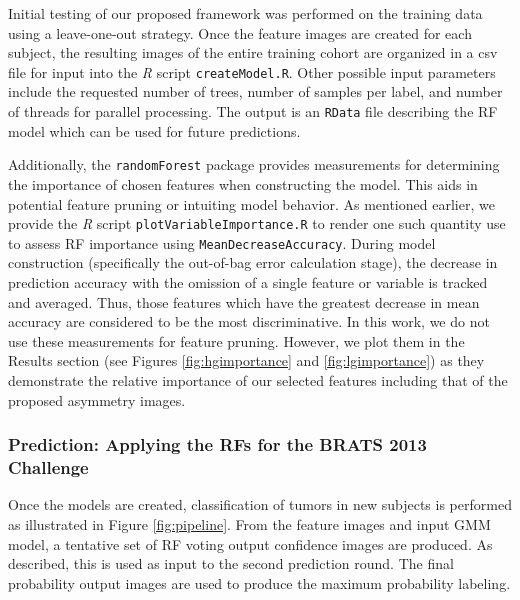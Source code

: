 Initial testing of our proposed framework was performed 
on the training data using a leave-one-out strategy.  Once the
feature images are created for each subject, the resulting images of the entire
training cohort are organized in a csv file for input into the \textit{R} script
{\tt createModel.R}.  Other possible input parameters include the requested 
number of trees, number of samples per label, and number of threads for parallel
processing.  The output is an {\tt RData} file describing the RF
model which can be used for future predictions.
 
Additionally, the {\tt randomForest} package provides  measurements 
for determining the importance of chosen features when constructing the model.  
This aids in potential feature pruning or intuiting model behavior.  As mentioned
earlier, we provide the \textit{R} script {\tt plotVariableImportance.R} to render
one such quantity use to assess RF importance using {\tt MeanDecreaseAccuracy}.  
During model construction
(specifically the out-of-bag error calculation stage), the decrease in prediction accuracy
with the omission of a single feature or variable is tracked and averaged.  Thus,
those features which have the greatest decrease in mean accuracy are considered
to be the most discriminative.
In this work, we do not use these measurements for feature pruning.  However,
we plot them in the Results section (see Figures \ref{fig:hgimportance} and
\ref{fig:lgimportance}) as they demonstrate the relative importance of our
selected features including that of the proposed asymmetry images.

\subsubsection{Prediction:  Applying the RFs for the BRATS 2013 Challenge}

Once the models are created, classification of tumors in new subjects is performed
as illustrated in Figure \ref{fig:pipeline}.  From the feature images and input 
GMM model, a tentative set of RF voting output confidence images are produced.
As described, this is used as input to the second prediction round.  The 
final probability output images are used to produce the maximum probability labeling.  

